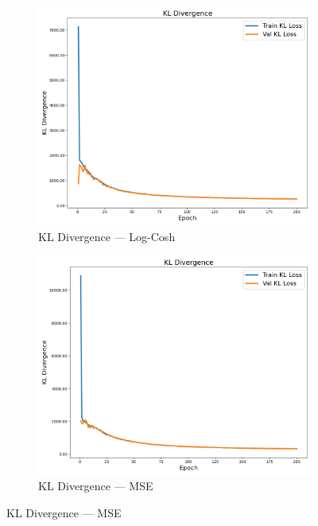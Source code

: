\begin{figure}[p]
    \centering
    \begin{subfigure}[b]{0.48\textwidth}
        \includegraphics[width=\textwidth]{img/vae_results/200_epochs_128_ls_logcosh/logcosh_kl_loss.png}
        \caption{KL Divergence — Log-Cosh}
    \end{subfigure}
    \hfill
    \begin{subfigure}[b]{0.48\textwidth}
        \includegraphics[width=\textwidth]{img/vae_results/200_epochs_128_ls_mse/mse_kl_loss.png}
        \caption{KL Divergence — MSE}
    \end{subfigure}


\end{figure}
